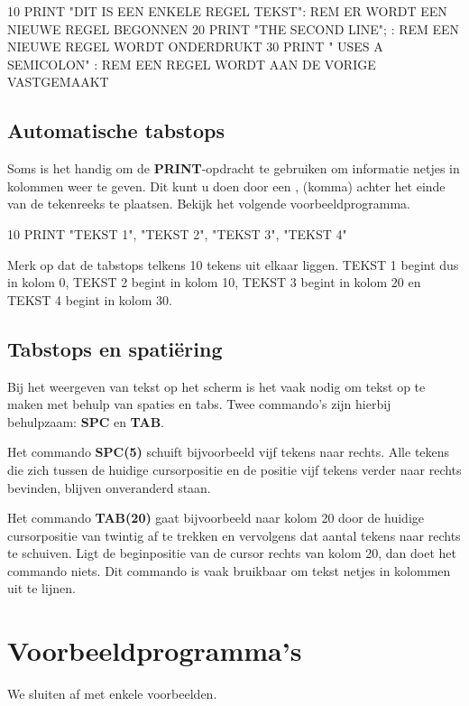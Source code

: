 \begin{screencode}
10 PRINT "DIT IS EEN ENKELE REGEL TEKST": REM ER WORDT EEN NIEUWE REGEL BEGONNEN
20 PRINT "THE SECOND LINE"; : REM EEN NIEUWE REGEL WORDT ONDERDRUKT
30 PRINT " USES A SEMICOLON" : REM EEN REGEL WORDT AAN DE VORIGE VASTGEMAAKT
\end{screencode}

\subsection{Automatische tabstops}Soms is het handig om de {\bf PRINT}-opdracht te gebruiken om informatie netjes in kolommen weer te geven. Dit kunt u doen door een , (komma) achter het einde van de tekenreeks te plaatsen. Bekijk het volgende voorbeeldprogramma.

\begin{screencode}
10 PRINT "TEKST 1", "TEKST 2", "TEKST 3", "TEKST 4"
\end{screencode}

Merk op dat de tabstops telkens 10 tekens uit elkaar liggen. TEKST 1 begint dus in kolom 0, TEKST 2 begint in kolom 10, TEKST 3 begint in kolom 20 en TEKST 4 begint in kolom 30.

\subsection{Tabstops en spatiëring}Bij het weergeven van tekst op het scherm is het vaak nodig om tekst op te maken met behulp van spaties en tabs. Twee commando's zijn hierbij behulpzaam: {\bf SPC} en {\bf TAB}.

Het commando {\bf SPC(5)} schuift bijvoorbeeld vijf tekens naar rechts. Alle tekens die zich tussen de huidige cursorpositie en de positie vijf tekens verder naar rechts bevinden, blijven onveranderd staan.

Het commando {\bf TAB(20)} gaat bijvoorbeeld naar kolom 20 door de huidige cursorpositie van twintig af te trekken en vervolgens dat aantal tekens naar rechts te schuiven. Ligt de beginpositie van de cursor rechts van kolom 20, dan doet het commando niets. Dit commando is vaak bruikbaar om tekst netjes in kolommen uit te lijnen.

\section{Voorbeeldprogramma's}

We sluiten af met enkele voorbeelden.

